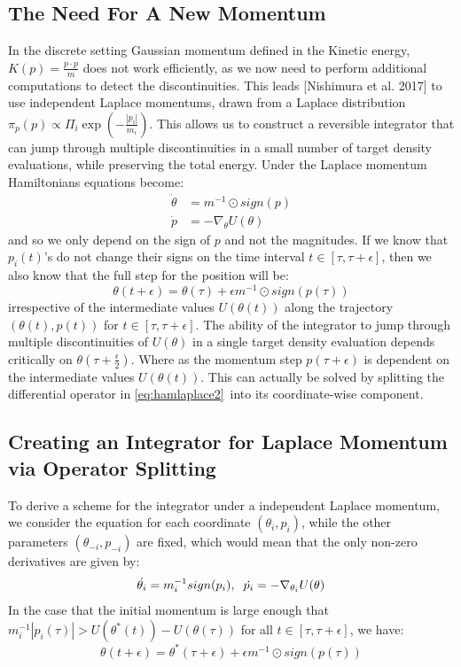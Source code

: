 \documentclass[]{report}
\begin{document}
\subsection{The Need For A New Momentum}
In the discrete setting Gaussian momentum defined in the Kinetic energy, $K(p) = \frac{p\cdot p}{m}$ does not work efficiently, as we now need to perform additional computations to detect the discontinuities. This leads [Nishimura et al. 2017] to use independent Laplace momentums, drawn from a Laplace distribution $\pi_{p}(p) \propto \Pi_{i} \exp(-\frac{|p_{i}|}{m_{i}})$. This allows us to construct a reversible integrator that can jump through multiple discontinuities in a small number of target density evaluations, while preserving the total energy. 
Under the Laplace momentum Hamiltonians equations become: \begin{align}
\label{eq:hamlaplace1}
\dot{\theta} &= m^{-1} \odot sign(p)\\
\label{eq:hamlaplace2}
\dot{p} &= -\nabla_{\theta} U(\theta)
\end{align}
and so we only depend on the sign of $p$ and not the magnitudes. If we know that $p_{i}(t)$'s do not change their signs on the time interval $t \in [\tau, \tau + \epsilon]$, then we also know that the full step for the position will be:\begin{equation}
\theta(t + \epsilon) = \theta(\tau) + \epsilon m^{-1} \odot sign(p(\tau))
\end{equation} irrespective of the intermediate values $U(\theta(t))$ along the trajectory $(\theta(t),p(t))$ for $t \in [\tau, \tau + \epsilon]$. The ability of the integrator to jump through multiple discontinuities of $U(\theta)$ in a single target density evaluation depends critically on $\theta(\tau + \frac{\epsilon}{2})$. Where as the momentum step $p(\tau + \epsilon)$ is dependent on the intermediate values $U(\theta(t))$. This can actually be solved by splitting the differential operator in \ref{eq:hamlaplace2}\, into its coordinate-wise component. 
\subsection{Creating an Integrator for Laplace Momentum via Operator Splitting}

To derive a scheme for the integrator under a independent Laplace momentum, we consider the equation for each coordinate $(\theta_{i}, p_{i})$, while the other parameters $(\theta_{-i},p_{-i})$ are fixed, which would mean that the only non-zero derivatives are given by:\begin{equation}
	\dot{\theta_{i}} = m^{-1}_{i} sign(p_{i}), \hspace{2mm} \dot{p_{i}} = -\nabla_{\theta_{i}} U(\theta) 
\end{equation}
In the case that the initial momentum is large enough that $m^{-1}_{i}|p_{i}(\tau)| > U(\theta^{*}(t)) - U(\theta(\tau))$ for all $t \in [\tau, \tau + \epsilon]$, we have: \begin{equation}
	\theta(t + \epsilon) = \theta^{*}(\tau + \epsilon) + \epsilon m^{-1} \odot sign(p(\tau))
\end{equation}
\end{document}
